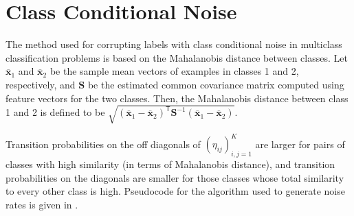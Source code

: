 \documentclass[letterpaper]{article} %
\newcommand{\bx}{{\bm{x}}}
\newcommand{\T}{{\mathsf{T}}}
\begin{document}
\section{Class Conditional Noise}
\label{app:class-conditional-noise}



The method used for corrupting labels with class conditional noise in multiclass classification problems is based on the Mahalanobis distance between classes.
Let $\overline{\bx}_1$ and $\overline{\bx}_2$ be the sample mean vectors of examples in classes 1 and 2, respectively, 
and $\mathbf{S}$ be the estimated common covariance matrix computed using feature vectors for the two classes. 
Then, the Mahalanobis distance between class 1 and 2 is defined to be 
$\sqrt{(\overline{\bx}_1-\overline{\bx}_2)^\T \mathbf{S}^{-1} (\overline{\bx}_1-\overline{\bx}_2)}$.


Transition probabilities on the off diagonals of $(\eta_{ij})_{i,j=1}^K$ are larger for pairs of classes with high similarity (in terms of Mahalanobis distance), and transition probabilities on the diagonals are smaller for those classes whose total similarity to every other class is high.
Pseudocode for the algorithm used to generate noise rates is given in . 
\end{document}
